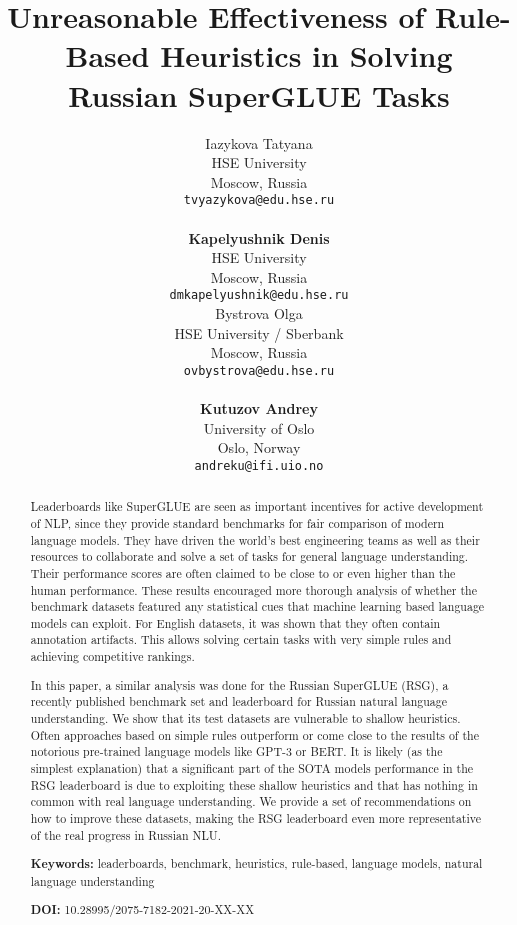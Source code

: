 \documentclass[11pt]{article}
\title{Unreasonable Effectiveness of Rule-Based Heuristics in Solving Russian SuperGLUE Tasks}
\author{Iazykova Tatyana \\
  HSE University \\
  Moscow, Russia \\
  {\tt tvyazykova@edu.hse.ru} \\
  \\
  \textbf{Kapelyushnik Denis} \\
  HSE University \\
  Moscow, Russia \\
  {\tt dmkapelyushnik@edu.hse.ru} \\\And
  Bystrova Olga \\
  HSE University / Sberbank \\
  Moscow, Russia \\
  {\tt ovbystrova@edu.hse.ru} \\
  \\
  \textbf{Kutuzov Andrey} \\
  University of Oslo \\
  Oslo, Norway \\
  {\tt andreku@ifi.uio.no}
  }
\date{}
\begin{document}
\maketitle
\bigskip
\bigskip
\bigskip
\bigskip
\begin{abstract}
Leaderboards like SuperGLUE are seen as important incentives for active development of NLP, since they provide standard benchmarks for fair comparison of modern language models. They have driven the world's best engineering teams as well as their resources to collaborate and solve a set of tasks for general language understanding. Their performance scores are often claimed to be close to or even higher than the human performance.
These results encouraged more thorough analysis of whether the benchmark datasets featured any statistical cues that machine learning based language models can exploit. For English datasets, it was shown that they often contain annotation artifacts. This allows solving certain tasks with very simple rules and achieving competitive rankings. 
  
  In this paper, a similar analysis was done for the Russian SuperGLUE (RSG), a recently published benchmark set and leaderboard for Russian natural language understanding. We show that its test datasets are vulnerable to shallow heuristics. Often approaches based on simple rules outperform or come close to the results of the notorious pre-trained language models like GPT-3 or BERT. It is likely (as the simplest explanation) that a significant part of the SOTA models performance in the RSG leaderboard is due to exploiting these shallow heuristics and that has nothing in common with real language understanding. We provide a set of recommendations on how to improve these datasets, making the RSG leaderboard even more representative of the real progress in Russian NLU.
  
  \textbf{Keywords:} leaderboards, benchmark, heuristics, rule-based, language models, natural language understanding
  
  \textbf{DOI:} 10.28995/2075-7182-2021-20-XX-XX
\end{abstract}

\end{document}
